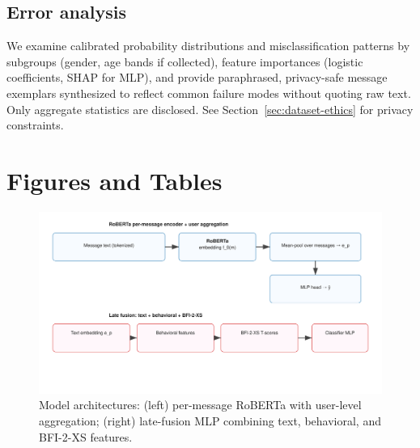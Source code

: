 \subsection{Error analysis}
\label{sec:methods-error-analysis}
We examine calibrated probability distributions and misclassification patterns by subgroups (gender, age bands if collected), feature importances (logistic coefficients, SHAP for MLP), and provide paraphrased, privacy-safe message exemplars synthesized to reflect common failure modes without quoting raw text. Only aggregate statistics are disclosed. See Section~\ref{sec:dataset-ethics} for privacy constraints.

\section{Figures and Tables}
\begin{figure}[t]
  \centering
  \includegraphics[width=0.9\linewidth]{thesis/figures/model_arch.svg}
  \caption{Model architectures: (left) per-message RoBERTa with user-level aggregation; (right) late-fusion MLP combining text, behavioral, and BFI-2-XS features.}
  \label{fig:model-arch}
\end{figure}



